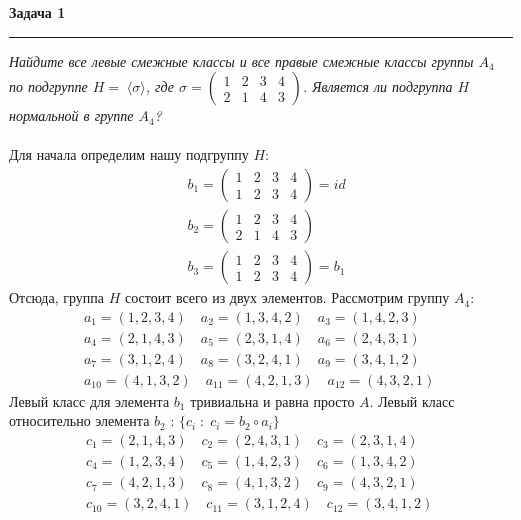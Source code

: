 \documentclass[a4paper,11pt]{article}
\begin{document}
\textbf{\large Задача 1}
\medskip\hrule\medskip
\textit{Найдите все левые смежные классы и все правые смежные классы группы $ A_4 $ по подгруппе $ H = \;  \langle\sigma\rangle $, где $ \sigma = \begin{pmatrix}
	1 & 2 & 3 & 4 \\[2pt]
	2 & 1 & 4 & 3
	\end{pmatrix} $. Является ли подгруппа $ H $ нормальной в группе $ A_4 $? } \\ \\ 
Для начала определим нашу подгруппу $ H $:
\begin{align*}
&b_1 = 
\begin{pmatrix}
1 & 2 & 3 & 4 \\[2pt]
1 & 2 & 3 & 4
\end{pmatrix}  = id \\
&b_2 = 
\begin{pmatrix}
1 & 2 & 3 & 4 \\[2pt]
2 & 1 & 4 & 3
\end{pmatrix} \\
&b_3 = 
\begin{pmatrix}
1 & 2 & 3 & 4 \\[2pt]
1 & 2 & 3 & 4
\end{pmatrix} = b_1
\end{align*}
Отсюда, группа $ H $ состоит всего из двух элементов. Рассмотрим группу $ A_4 $:
\begin{align*}
&a_{1} = ( 1, 2, 3, 4 ) \quad 
a_{2} = ( 1, 3, 4, 2 ) \quad 
a_{3} = ( 1, 4, 2, 3 ) \quad  \\
&a_{4} = ( 2, 1, 4, 3 ) \quad 
a_{5} = ( 2, 3, 1, 4 ) \quad 
a_{6} = ( 2, 4, 3, 1 ) \quad  \\
&a_{7} = ( 3, 1, 2, 4 ) \quad 
a_{8} = ( 3, 2, 4, 1 ) \quad 
a_{9} = ( 3, 4, 1, 2 ) \quad  \\
&a_{10} = ( 4, 1, 3, 2 ) \quad 
a_{11} = ( 4, 2, 1, 3 ) \quad 
a_{12} = ( 4, 3, 2, 1 ) \quad
\end{align*}
Левый класс  для элемента $ b_1 $ тривиальна и равна просто $ A $. Левый класс относительно элемента $ b_2 $ : $ \{ c_i \; : \; c_i = b_2 \circ a_i \}  $
\begin{align*}
&c_{1} = ( 2, 1, 4, 3 ) \quad 
c_{2} = ( 2, 4, 3, 1 ) \quad 
c_{3} = ( 2, 3, 1, 4 ) \quad  \\
&c_{4} = ( 1, 2, 3, 4 ) \quad 
c_{5} = ( 1, 4, 2, 3 ) \quad 
c_{6} = ( 1, 3, 4, 2 ) \quad  \\
&c_{7} = ( 4, 2, 1, 3 ) \quad 
c_{8} = ( 4, 1, 3, 2 ) \quad 
c_{9} = ( 4, 3, 2, 1 ) \quad  \\
&c_{10} = ( 3, 2, 4, 1 ) \quad 
c_{11} = ( 3, 1, 2, 4 ) \quad 
c_{12} = ( 3, 4, 1, 2 ) \quad
\end{align*} 
\end{document}
